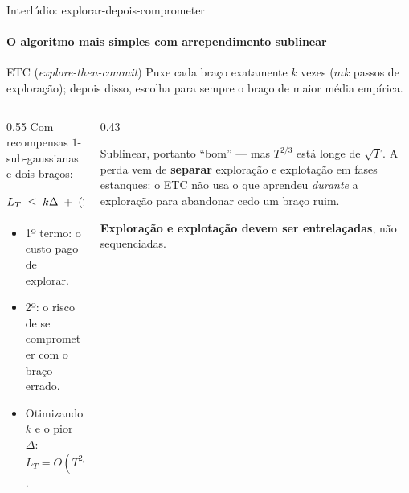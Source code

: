 \documentclass[aspectratio=169, 10pt]{beamer}
\newcommand{\gap}{\Delta}
\newcommand{\Reg}{L}
\begin{document}
\begin{frame}{Interlúdio: explorar-depois-comprometer}
  \framesubtitle{O algoritmo mais simples com arrependimento sublinear}

  \begin{algbox}{ETC (\emph{explore-then-commit})}
    Puxe cada braço exatamente $k$ vezes ($mk$ passos de exploração);
    depois disso, escolha para sempre o braço de maior média empírica.
  \end{algbox}

  \begin{columns}[T]
    \begin{column}{0.55\textwidth}
      Com recompensas $1$-sub-gaussianas e dois braços:
      \[
        \Reg_T \;\le\; k\gap
          \;+\; (T - 2k)\,\gap \exp\Bigl(-\frac{k\gap^2}{4}\Bigr).
      \]
      \begin{itemize}\small
        \item 1º termo: o custo pago de explorar.
        \item 2º: o risco de se comprometer com o braço errado.
        \item Otimizando $k$ e o pior $\gap$: $\Reg_T = O(T^{2/3})$.
      \end{itemize}
    \end{column}
    \begin{column}{0.43\textwidth}
      \begin{ideiabox}[fontupper=\footnotesize]
        Sublinear, portanto ``bom'' --- mas $T^{2/3}$ está longe de
        $\sqrt{T}$. A perda vem de \textbf{separar} exploração e explotação
        em fases estanques: o ETC não usa o que aprendeu \emph{durante} a
        exploração para abandonar cedo um braço ruim.
      \end{ideiabox}
      \begin{alertabox}[fontupper=\footnotesize]
        \textbf{Exploração e explotação devem ser entrelaçadas}, não
        sequenciadas.
      \end{alertabox}
    \end{column}
  \end{columns}
\end{frame}
\end{document}
